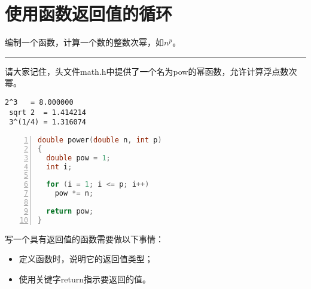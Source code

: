 \section{使用函数返回值的循环}
\begin{frame}[fragile]\ft{\secname}
\begin{li}
编制一个函数，计算一个数的整数次幂，如$n^p$。
\end{li}
\rule{\textwidth}{1mm}\pause \vspace{0.1in}

请大家记住，头文件math.h中提供了一个名为pow的幂函数，允许计算浮点数次幂。


\end{frame}


\begin{frame}[fragile]



\end{frame}


\begin{frame}[fragile]


\begin{lstlisting}[backgroundcolor=\color{red!10}]
   2^3   = 8.000000
 sqrt 2  = 1.414214
 3^(1/4) = 1.316074
\end{lstlisting}

\end{frame}


\begin{frame}[fragile]\ft{\secname}
\begin{lstlisting}[language=c,numbers=left,frame=single]
double power(double n, int p)
{
  double pow = 1;
  int i;
  
  for (i = 1; i <= p; i++)
    pow *= n;
    
  return pow;
}
\end{lstlisting}
\end{frame}


\begin{frame}[fragile]\ft{\secname}
写一个具有返回值的函数需要做以下事情：\vspace{0.1in}

\begin{itemize}
\item 定义函数时，说明它的返回值类型；\\[0.1in]
\item 使用关键字return指示要返回的值。
\end{itemize}
\end{frame}


